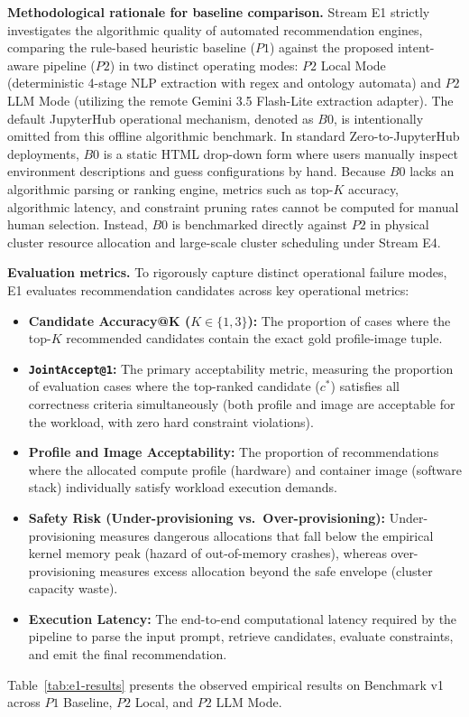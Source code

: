 \textbf{Methodological rationale for baseline comparison.}
Stream E1 strictly investigates the algorithmic quality of automated recommendation engines, comparing the rule-based heuristic baseline ($P1$) against the proposed intent-aware pipeline ($P2$) in two distinct operating modes: $P2$ Local Mode (deterministic 4-stage NLP extraction with regex and ontology automata) and $P2$ LLM Mode (utilizing the remote Gemini 3.5 Flash-Lite extraction adapter). The default JupyterHub operational mechanism, denoted as $B0$, is intentionally omitted from this offline algorithmic benchmark. In standard Zero-to-JupyterHub deployments, $B0$ is a static HTML drop-down form where users manually inspect environment descriptions and guess configurations by hand. Because $B0$ lacks an algorithmic parsing or ranking engine, metrics such as top-$K$ accuracy, algorithmic latency, and constraint pruning rates cannot be computed for manual human selection. Instead, $B0$ is benchmarked directly against $P2$ in physical cluster resource allocation and large-scale cluster scheduling under Stream E4.

\textbf{Evaluation metrics.}
To rigorously capture distinct operational failure modes, E1 evaluates recommendation candidates across key operational metrics:
\begin{itemize}
    \item \textbf{Candidate Accuracy@K ($K \in \{1, 3\}$):} The proportion of cases where the top-$K$ recommended candidates contain the exact gold profile-image tuple.
    \item \textbf{\texttt{JointAccept@1}:} The primary acceptability metric, measuring the proportion of evaluation cases where the top-ranked candidate ($c^*$) satisfies all correctness criteria simultaneously (both profile and image are acceptable for the workload, with zero hard constraint violations).
    \item \textbf{Profile and Image Acceptability:} The proportion of recommendations where the allocated compute profile (hardware) and container image (software stack) individually satisfy workload execution demands.
    \item \textbf{Safety Risk (Under-provisioning vs.\ Over-provisioning):} Under-provisioning measures dangerous allocations that fall below the empirical kernel memory peak (hazard of out-of-memory crashes), whereas over-provisioning measures excess allocation beyond the safe envelope (cluster capacity waste).
    \item \textbf{Execution Latency:} The end-to-end computational latency required by the pipeline to parse the input prompt, retrieve candidates, evaluate constraints, and emit the final recommendation.
\end{itemize}
Table~\ref{tab:e1-results} presents the observed empirical results on Benchmark v1 across $P1$ Baseline, $P2$ Local, and $P2$ LLM Mode.

